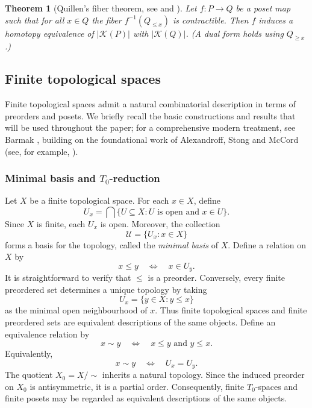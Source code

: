 \documentclass[a4paper,11pt]{article}
\newtheorem{theorem}{Theorem}[section]
\theoremstyle{definition}
\theoremstyle{remark}
\begin{document}
\begin{theorem}[Quillen's fiber theorem, see {\cite[Proposition~1.6]{Qui78}} and {\cite[Theorem~4.2.1]{Smi11}}]\label{thm:quillen_fiber_theorem}
  Let $f\colon P\to Q$ be a poset map such that for all $x\in Q$ the fiber $f^{-1}(Q_{\leq x})$ is contractible. Then $f$ induces a homotopy equivalence of $|\mathcal{K}(P)|$ with $|\mathcal{K}(Q)|$. (A dual form holds using $Q_{\geq x}$.)
\end{theorem}

\subsection{Finite topological spaces}\label{subsec:finite-spaces-background}

Finite topological spaces admit a natural combinatorial description in terms of preorders and posets. We briefly recall the basic constructions and results that will be used throughout the paper; for a comprehensive modern treatment, see Barmak \cite{Bar11}, building on the foundational
work of Alexandroff, Stong and McCord (see, for example, \cite{Ale37,Sto66,McC66}).

\subsubsection*{Minimal basis and $T_0$-reduction}

Let $X$ be a finite topological space. For each $x\in X$, define
$$ U_x=\bigcap\{U\subseteq X\colon U\text{ is open and }x\in U\}. $$
Since $X$ is finite, each $U_x$ is open. Moreover, the collection
$$ \mathcal{U}=\{U_x\colon x\in X\} $$
forms a basis for the topology, called the \emph{minimal basis} of $X$. Define a relation on $X$ by
$$ x\leq y \quad\Longleftrightarrow\quad x\in U_y. $$
It is straightforward to verify that $\leq$ is a preorder. Conversely, every finite preordered set determines a unique topology by taking
$$ U_x=\{y\in X\colon y\le x\} $$
as the minimal open neighbourhood of $x$. Thus finite topological spaces and finite preordered sets are equivalent descriptions of the same objects. Define an equivalence relation by
$$ x\sim y \quad\Longleftrightarrow\quad x\leq y\text{ and }y\leq x. $$
Equivalently,
$$ x\sim y \quad\Longleftrightarrow\quad U_x=U_y. $$
The quotient $X_0=X/{\sim}$ inherits a natural topology. Since the induced preorder on $X_0$ is antisymmetric, it is a partial order. Consequently, finite $T_0$-spaces and finite posets may be regarded as equivalent descriptions of the same objects.
\end{document}
